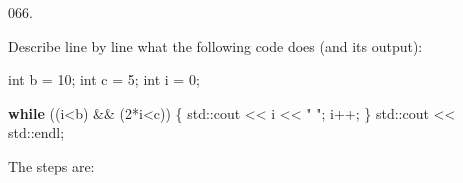 \documentclass[]{book}
\newenvironment{Shaded}{}{}
\newcommand{\BuiltInTok}[1]{#1}
\newcommand{\ControlFlowTok}[1]{\textcolor[rgb]{0.00,0.44,0.13}{\textbf{#1}}}
\newcommand{\DataTypeTok}[1]{\textcolor[rgb]{0.56,0.13,0.00}{#1}}
\newcommand{\DecValTok}[1]{\textcolor[rgb]{0.25,0.63,0.44}{#1}}
\newcommand{\NormalTok}[1]{#1}
\newcommand{\StringTok}[1]{\textcolor[rgb]{0.25,0.44,0.63}{#1}}
\begin{document}
\vspace{2mm}\noindent\hrulefill{}

\begin{minipage}{\linewidth}\noindent
{\tiny 066.}\\
\begin{minipage}[t]{.485\linewidth}

Describe line by line what the following code does (and its output):

\begin{framed}

\begin{Shaded}
\begin{Highlighting}[]
\DataTypeTok{int}\NormalTok{ b = }\DecValTok{10}\NormalTok{;}
\DataTypeTok{int}\NormalTok{ c = }\DecValTok{5}\NormalTok{;}
\DataTypeTok{int}\NormalTok{ i = }\DecValTok{0}\NormalTok{;}

\ControlFlowTok{while}\NormalTok{ ((i<b) && (}\DecValTok{2}\NormalTok{*i<c)) \{}
  \BuiltInTok{std::}\NormalTok{cout << i << }\StringTok{" "}\NormalTok{;}
\NormalTok{  i++;}
\NormalTok{\}}
\BuiltInTok{std::}\NormalTok{cout << }\BuiltInTok{std::}\NormalTok{endl;}
\end{Highlighting}
\end{Shaded}

\end{framed}

\end{minipage}
\hfill
\begin{minipage}[t]{.485\linewidth}

The steps are:


\end{minipage}
\end{minipage}
\end{document}
